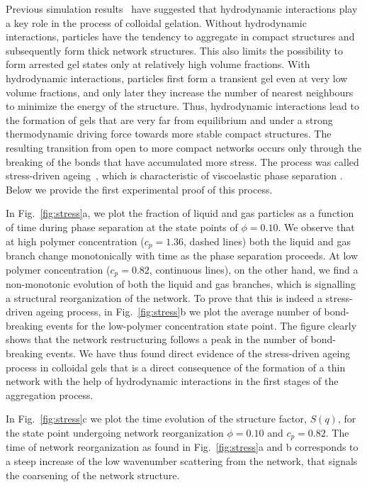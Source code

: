 \documentclass[twocolumn,superscriptaddress,showpacs,preprintnumbers,
amsmath,amssymb,prl]{revtex4-1}
\begin{document}
Previous simulation results~\cite{tanaka2000,tanaka2007spontaneous,furukawa2010key} have suggested that hydrodynamic interactions play
a key role in the process of colloidal gelation. Without hydrodynamic interactions, particles have the tendency to
aggregate in compact structures and subsequently form thick network structures. This also limits the possibility to
form arrested gel states only at relatively high volume fractions. With hydrodynamic interactions, particles first form
a transient gel even at very low volume fractions, and only later they increase the number of
nearest neighbours to minimize the energy of the structure. 
Thus, hydrodynamic interactions lead to the formation of gels that are very far from equilibrium and under a strong thermodynamic driving force 
towards more stable compact structures. 
The resulting transition from open to more compact networks occurs only through
the breaking of the bonds that have accumulated more stress. The process was called stress-driven ageing~\cite{tanaka2007spontaneous}, 
which is characteristic of viscoelastic phase separation \cite{tanaka2000viscoelastic}. 
Below we provide the first experimental proof of this process.

In Fig.~\ref{fig:stress}a, we plot the fraction of liquid and gas particles as a function of time during phase separation
at the state points of $\phi=0.10$. We observe that at high polymer concentration ($c_p=1.36$, dashed lines) both the
liquid and gas branch change monotonically with time as the phase separation proceeds. At low polymer concentration
($c_p=0.82$, continuous lines), on the other hand, we find a non-monotonic evolution of both the liquid and gas branches, which is signalling
a structural reorganization of the network. To prove that this is indeed a stress-driven ageing process, in Fig.~\ref{fig:stress}b 
we plot the average number of bond-breaking events for the low-polymer concentration state point. The figure clearly shows that
the network restructuring follows a peak in the number of bond-breaking events. We have thus found direct evidence of the
stress-driven ageing process in colloidal gels that is a direct consequence of the formation of a thin network with the help of hydrodynamic interactions in the first stages
of the aggregation process.

In Fig.~\ref{fig:stress}c we plot the time evolution of the structure factor, $S(q)$, for the state point
undergoing network reorganization $\phi=0.10$ and $c_p=0.82$. The time of network reorganization as found in Fig.~\ref{fig:stress}a and b
corresponds to a steep increase of the low wavenumber scattering from the network, that signals the coarsening of the network structure. 
\end{document}
